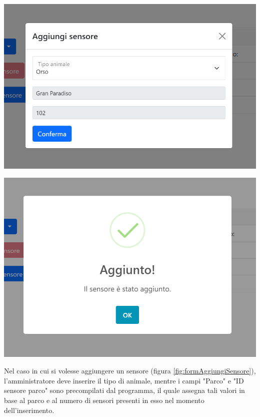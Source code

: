 \newpage
\begin{multicols}{2}
    \begin{Figure}
        \centering
        \includegraphics[scale=0.5]{Img/aggiungiSensore.png}
        \label{fig:formAggiungiSensore}
    \end{Figure}
    \begin{Figure}
        \centering
        \includegraphics[scale=0.45]{Img/avvenutaAggiunta.png}
        \label{fig:avvenutaAggiunta}
    \end{Figure}
\end{multicols}

Nel caso in cui si volesse aggiungere un sensore (figura \ref{fig:formAggiungiSensore}), l'amministratore deve inserire il tipo di animale, mentre 
i campi "Parco" e "ID sensore parco" sono precompilati dal programma, il quale assegna tali valori in base al parco e al numero di sensori presenti in esso nel momento dell'inserimento.

